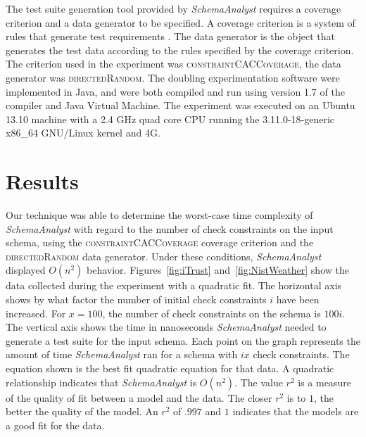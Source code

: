\documentclass[smallextended]{svjour3}       %
\begin{document}
The test suite generation tool provided by \textit{SchemaAnalyst}
requires a coverage criterion and a data generator to be specified. A
coverage criterion is a system of rules that generate test requirements
\cite{Ammann:Testing}. The data generator is the object that generates
the test data according to the rules specified by the coverage
criterion. The criterion used in the experiment was
\textsc{constraintCACCoverage}, 
the data generator was \textsc{directedRandom}. The
doubling experimentation software were implemented in Java, and were both compiled and run using
version 1.7 of the compiler and Java Virtual Machine. The experiment was executed on an Ubuntu 13.10 machine with a 2.4
GHz quad core CPU running the 3.11.0-18-generic x86\_64 GNU/Linux
kernel and 4G.

\section{Results}
Our technique was able to determine the worst-case time
complexity of \textit{SchemaAnalyst} with regard to the number of check
constraints on the input schema, using the
\textsc{constraintCACCoverage} coverage criterion and the
\textsc{directedRandom} data generator. Under these conditions, 
\textit{SchemaAnalyst} displayed $O(n^2)$ behavior. Figures~\ref{fig:iTrust} 
and~\ref{fig:NistWeather} show the data collected during the experiment with a
quadratic fit. The horizontal axis shows by what factor the number of initial
check constraints $i$ have been increased. For $x = 100$, the number of check
constraints on the schema is $100i$. The vertical axis shows the time in
nanoseconds \textit{SchemaAnalyst} needed to generate a test suite for
the input schema. Each point on the graph represents the amount of time
\textit{SchemaAnalyst} ran for a schema with $ix$ check constraints.
The equation shown is the best fit quadratic equation for that data.  A
quadratic relationship indicates that \textit{SchemaAnalyst} is
$O(n^2)$.  The value $r^2$ is a measure of the quality of fit between a model and
the data. The closer $r^2$ is to $1$, the better the quality of the
model.  An $r^2$ of $.997$ and $1$ indicates that the models are a good fit for
the data.
\end{document}
